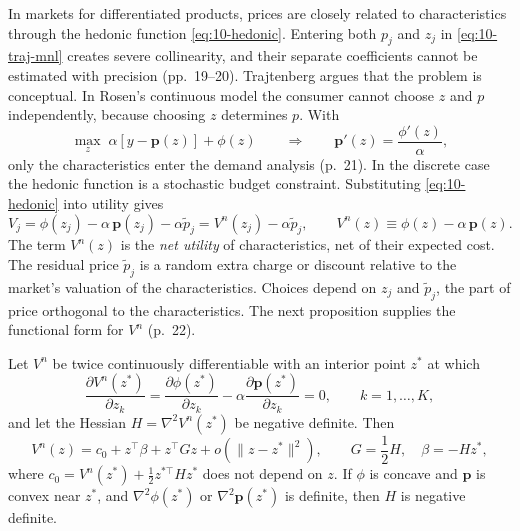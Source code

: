  In markets for differentiated products, prices are closely
related to characteristics through the hedonic function \eqref{eq:10-hedonic}. Entering both $p_j$ and $z_j$ in
\eqref{eq:10-traj-mnl} creates severe collinearity, and their separate coefficients cannot be estimated with
precision (pp.~19--20). Trajtenberg argues that the problem is conceptual. In Rosen's continuous model the
consumer cannot choose $z$ and $p$ independently, because choosing $z$ determines $p$. With
\begin{equation}\label{eq:10-traj-rosen}
\max_{z}\; \alpha[y - \mathbf{p}(z)] + \phi(z)
\qquad\Longrightarrow\qquad
\mathbf{p}'(z) = \frac{\phi'(z)}{\alpha},
\end{equation}
only the characteristics enter the demand analysis (p.~21). In the discrete case the hedonic function is a
stochastic budget constraint. Substituting \eqref{eq:10-hedonic} into utility gives
\begin{equation}\label{eq:10-traj-netutility}
V_j = \phi(z_j) - \alpha\,\mathbf{p}(z_j) - \alpha\tilde p_j = V^n(z_j) - \alpha\tilde p_j,
\qquad
V^n(z) \equiv \phi(z) - \alpha\,\mathbf{p}(z).
\end{equation}
The term $V^n(z)$ is the \emph{net utility} of characteristics, net of their expected cost. The residual price
$\tilde p_j$ is a random extra charge or discount relative to the market's valuation of the characteristics.
Choices depend on $z_j$ and $\tilde p_j$, the part of price orthogonal to the characteristics. The next proposition
supplies the functional form for $V^n$ (p.~22).

\begin{proposition}\label{prop:10-quadratic}
Let $V^n$ be twice continuously differentiable with an interior point $z^*$ at which
\begin{equation*}
\frac{\partial V^n(z^*)}{\partial z_k} = \frac{\partial\phi(z^*)}{\partial z_k} - \alpha\frac{\partial\mathbf{p}(z^*)}{\partial z_k}
= 0,\qquad k = 1,\dots,K,
\end{equation*}
and let the Hessian $H = \nabla^2 V^n(z^*)$ be negative definite. Then
\begin{equation}\label{eq:10-quadratic}
V^n(z) = c_0 + z^\top\beta + z^\top Gz + o\left(\|z - z^*\|^2\right),
\qquad G = \frac{1}{2}H,\quad \beta = -Hz^*,
\end{equation}
where $c_0 = V^n(z^*) + \frac{1}{2}z^{*\top}Hz^*$ does not depend on $z$. If $\phi$ is concave and $\mathbf{p}$ is
convex near $z^*$, and $\nabla^2\phi(z^*)$ or $\nabla^2\mathbf{p}(z^*)$ is definite, then $H$ is negative definite.
\end{proposition}

